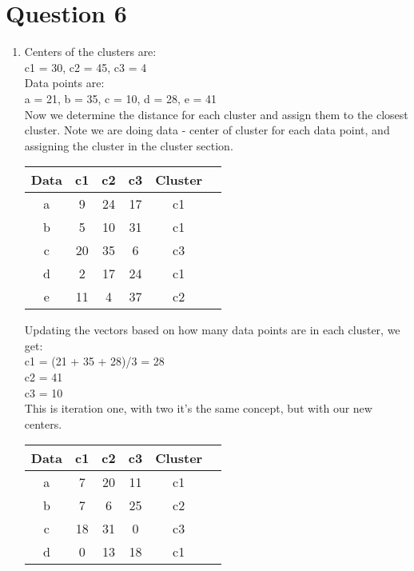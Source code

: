\documentclass{article}
\begin{document}
\section*{Question 6}
\begin{enumerate}[label=(\alph*)]
    \item Centers of the clusters are:
    \\c1 = 30, c2 = 45, c3 = 4
    \\Data points are:
    \\a = 21, b = 35, c = 10, d = 28, e = 41
    \\Now we determine the distance for each cluster and assign them to the closest cluster.
    Note we are doing data - center of cluster for each data point, and assigning the cluster in the cluster section.
    \begin{table}[h]
        \centering
        \begin{tabular}{|c|c|c|c|c|c|}
        \hline
        Data & c1 & c2 & c3 & Cluster\\ \hline
        a    & 9  & 24 & 17  & c1     \\ \hline
        b    & 5  & 10 &  31 & c1     \\ \hline
        c    & 20 & 35 & 6  & c3     \\ \hline
        d    & 2  & 17 & 24 & c1       \\ \hline
        e    & 11 & 4  & 37 & c2             \\ \hline
        \end{tabular}
    \end{table}
    Updating the vectors based on how many data points are in each cluster, we get:
    \\c1 = (21 + 35 + 28)/3 = 28
    \\c2 = 41
    \\c3 = 10
    \\This is iteration one, with two it's the same concept, but with our new centers.
    \begin{table}[h]
        \centering
        \begin{tabular}{|c|c|c|c|c|c|}
        \hline
        Data & c1 & c2 & c3 & Cluster\\ \hline
        a    & 7  & 20 & 11  & c1     \\ \hline
        b    & 7  & 6  & 25  & c2     \\ \hline
        c    & 18 & 31 & 0   & c3     \\ \hline
        d    & 0  & 13 & 18  & c1     \\ \hline

\end{tabular}
\end{table}
\end{enumerate}
\end{document}
